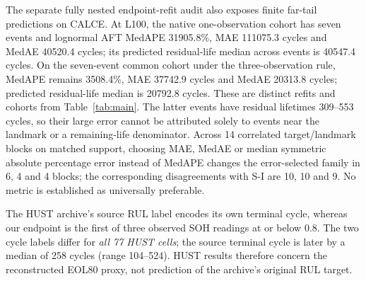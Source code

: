\documentclass[preprint,12pt]{elsarticle}
\begin{document}
The separate fully nested endpoint-refit audit also exposes finite far-tail predictions on CALCE. At L100, the native one-observation cohort has seven events and lognormal AFT MedAPE 31905.8\%, MAE 111075.3 cycles and MedAE 40520.4 cycles; its predicted residual-life median across events is 40547.4 cycles. On the seven-event common cohort under the three-observation rule, MedAPE remains 3508.4\%, MAE 37742.9 cycles and MedAE 20313.8 cycles; predicted residual-life median is 20792.8 cycles. These are distinct refits and cohorts from Table~\ref{tab:main}. The latter events have residual lifetimes 309--553 cycles, so their large error cannot be attributed solely to events near the landmark or a remaining-life denominator. Across 14 correlated target/landmark blocks on matched support, choosing MAE, MedAE or median symmetric absolute percentage error instead of MedAPE changes the error-selected family in 6, 4 and 4 blocks; the corresponding disagreements with S-I are 10, 10 and 9. No metric is established as universally preferable.

The HUST archive's source RUL label encodes its own terminal cycle, whereas our endpoint is the first of three observed SOH readings at or below 0.8. The two cycle labels differ for \emph{all 77 HUST cells}; the source terminal cycle is later by a median of 258 cycles (range 104--524). HUST results therefore concern the reconstructed EOL80 proxy, not prediction of the archive's original RUL target.
\end{document}
